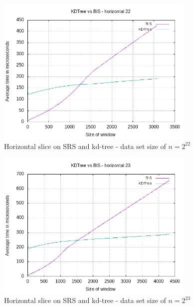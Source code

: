 \begin{figure}[h]
    \centering
    \includegraphics[width = 0.85\textwidth]{pictures/analysis/hori_22.png}
    \caption{Horizontal slice on SRS and kd-tree - data set size of $n=2^{22}$}\label{fig:hori_22}
\end{figure}

\begin{figure}[h]
    \centering
    \includegraphics[width = 0.85\textwidth]{pictures/analysis/hori_23.png}
    \caption{Horizontal slice on SRS and kd-tree - data set size of $n=2^{23}$}\label{fig:hori_23}
\end{figure}

